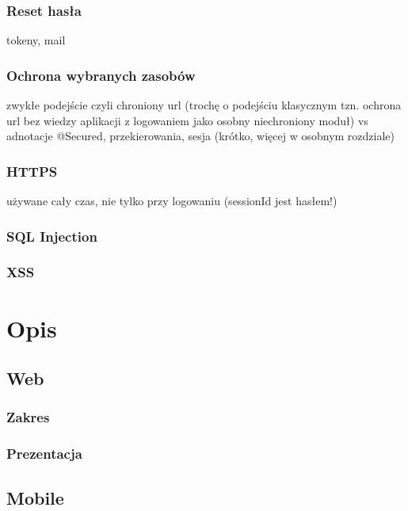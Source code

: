 \documentclass[11pt]{aghdpl}
\begin{document}

\subsection{Reset hasła}

tokeny, mail

\subsection{Ochrona wybranych zasobów}
\label{sec:ochronaWybranychZasobow}

zwykłe podejście czyli chroniony url (trochę o podejściu klasycznym tzn. ochrona url bez wiedzy aplikacji z logowaniem jako osobny niechroniony moduł) vs adnotacje
@Secured, przekierowania, sesja (krótko, więcej w osobnym rozdziale)

\subsection{HTTPS}

używane cały czas, nie tylko przy logowaniu (sessionId jest hasłem!)

\subsection{SQL Injection}

\subsection{XSS}



\chapter{Opis}
\label{cha:opis}

\section{Web}
\subsection{Zakres}
\subsection{Prezentacja}
\section{Mobile}
\end{document}
